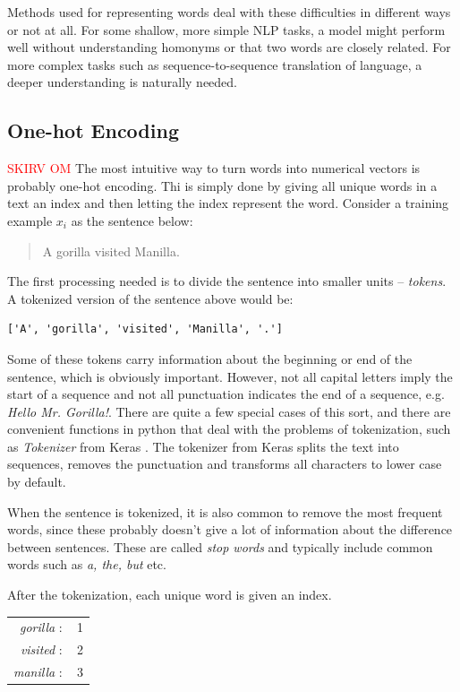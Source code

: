 Methods used for representing words deal with these difficulties in different ways or not at all. For some shallow, more simple NLP tasks, a model might perform well without understanding homonyms or that two words are closely related. For more complex tasks such as sequence-to-sequence translation of language, a deeper understanding is naturally needed. 

\subsection{One-hot Encoding}
\textcolor{red}{SKIRV OM }
The most intuitive way to turn words into numerical vectors is probably one-hot encoding. Thi is simply done by giving all unique words in a text an index and then letting the index represent the word. Consider a training example $x_i$ as the sentence below:

\begin{quote}
A gorilla visited Manilla.
\end{quote}

The first processing needed is to divide the sentence into smaller units -- \emph{tokens}. A tokenized version of the sentence above would be:
\begin{verbatim}
['A', 'gorilla', 'visited', 'Manilla', '.']
\end{verbatim}

Some of these tokens carry information about the beginning or end of the sentence, which is obviously important. However, not all capital letters imply the start of a sequence and not all punctuation indicates the end of a sequence, e.g. \textit{Hello Mr. Gorilla!}. There are quite a few special cases of this sort, and there are convenient functions in python that deal with the problems of tokenization, such as \textit{Tokenizer} from Keras \citep{chollet2020keras}. The tokenizer from Keras splits the text into sequences, removes the punctuation and transforms all characters to lower case by default. 

When the sentence is tokenized, it is also common to remove the most frequent words, since these probably doesn't give a lot of information about the difference between sentences. These are called \textit{stop words} and typically include common words such as \textit{a, the, but} etc.

After the tokenization, each unique word is given an index. 
\begin{center}
    \begin{tabular}{rc}
        \textit{gorilla} $:$ & 1 \\
        \textit{visited} $:$ & 2 \\
        \textit{manilla} $:$ & 3 \\
    \end{tabular}
\end{center}

